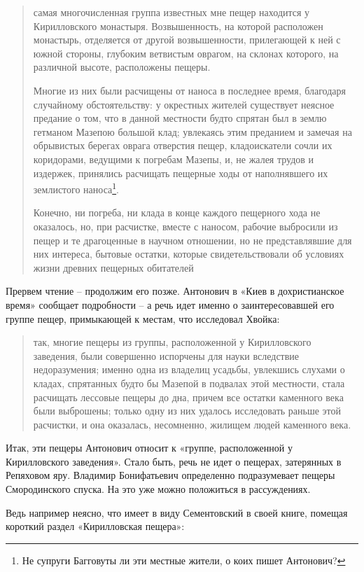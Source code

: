 \begin{quotation}
самая многочисленная группа известных мне пещер находится у Кирилловского монастыря. Возвышенность, на которой расположен монастырь, отделяется от другой возвышенности, прилегающей к ней с южной стороны, глубоким ветвистым оврагом, на склонах которого, на различной высоте, расположены пещеры.

Многие из них были расчищены от наноса в последнее время, благодаря случайному обстоятельству: у окрестных жителей существует неясное предание о том, что в данной местности будто спрятан был в землю гетманом Мазепою большой клад; увлекаясь этим преданием и замечая на обрывистых берегах оврага отверстия пещер, кладоискатели сочли их коридорами, ведущими к погребам Мазепы, и, не жалея трудов и издержек, принялись расчищать пещерные ходы от наполнявшего их землистого наноса\footnote{Не супруги Багговуты ли эти местные жители, о коих пишет Антонович?}. 

Конечно, ни погреба, ни клада в конце каждого пещерного хода не оказалось, но, при расчистке, вместе с наносом, рабочие выбросили из пещер и те драгоценные в научном отношении, но не представлявшие для них интереса, бытовые остатки, которые свидетельствовали об условиях жизни древних пещерных обитателей
\end{quotation}

Прервем чтение – продолжим его позже. Антонович в «Киев в дохристианское время» сообщает подробности – а речь идет именно о заинтересовавшей его группе пещер, примыкающей к местам, что исследовал Хвойка: 

\begin{quotation}
так, многие пещеры из группы, расположенной у Кирилловского заведения, были совершенно испорчены для науки вследствие недоразумения; именно одна из владелиц усадьбы, увлекшись слухами о кладах, спрятанных будто бы Мазепой в подвалах этой местности, стала расчищать лессовые пещеры до дна, причем все остатки каменного века были выброшены; только одну из них удалось исследовать раньше этой расчистки, и она оказалась, несомненно, жилищем людей каменного века.
\end{quotation}

Итак, эти пещеры Антонович относит к «группе, расположенной у Кирилловского заведения». Стало быть, речь не идет о пещерах, затерянных в Репяховом яру. Владимир Бонифатьевич определенно подразумевает пещеры Смородинского спуска. На это уже можно положиться в рассуждениях.

Ведь например неясно, что имеет в виду Сементовский в своей книге\cite{sement01}, помещая короткий раздел «Кирилловская пещера»:

